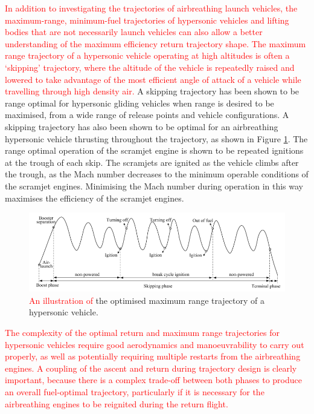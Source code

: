 \textcolor{red}{
	In addition to investigating the trajectories of airbreathing launch vehicles, the maximum-range, minimum-fuel trajectories of hypersonic vehicles and lifting bodies that are not necessarily launch vehicles can also allow a better understanding of the maximum efficiency return trajectory shape. The maximum range trajectory of a hypersonic vehicle operating at high altitudes is often a `skipping' trajectory, where the altitude of the vehicle is repeatedly raised and lowered to take advantage of the most efficient angle of attack of a vehicle while travelling through high density air\cite{Moshman2014,Darby2011,Toso2015,Chai2015,Pesch1980}.} A skipping trajectory has been shown to be range optimal for hypersonic gliding vehicles when range is desired to be maximised, from a wide range of release points and vehicle configurations\cite{Eggers1957,Moshman2014,Pesch1980,Moshman2014,Darby2011,Toso2015,Tetlow1992,Darby2011}. A skipping trajectory has also been shown to be optimal for an airbreathing hypersonic vehicle thrusting throughout the trajectory\cite{Kanda2007,Chai2015}, as shown in Figure \ref{fig:chai-boostskip}. The range optimal operation of the scramjet engine is shown to be repeated ignitions at the trough of each skip\cite{Chai2015}. The scramjets are ignited as the vehicle climbs after the trough, as the Mach number decreases to the minimum operable conditions of the scramjet engines\cite{Chai2015}. Minimising the Mach number during operation in this way maximises the efficiency of the scramjet engines\cite{Chai2015}.
\begin{figure}[ht]
	\centering
	\includegraphics[width=0.9\linewidth]{"figures/2_literature-review/chai-boost skip"}
	\caption{\textcolor{red}{An illustration of }the optimised maximum range trajectory of a hypersonic vehicle\cite{Chai2015}.}
	\label{fig:chai-boostskip}
\end{figure}

\textcolor{red}{
The complexity of the optimal return and maximum range trajectories for hypersonic vehicles require good aerodynamics and manoeuvrability to carry out properly, as well as potentially requiring multiple restarts from the airbreathing engines.
	A coupling of the ascent and return during trajectory design is clearly important, because there is a complex trade-off between both phases to produce an overall fuel-optimal trajectory, particularly if it is necessary for the airbreathing engines to be reignited during the return flight. 
}





